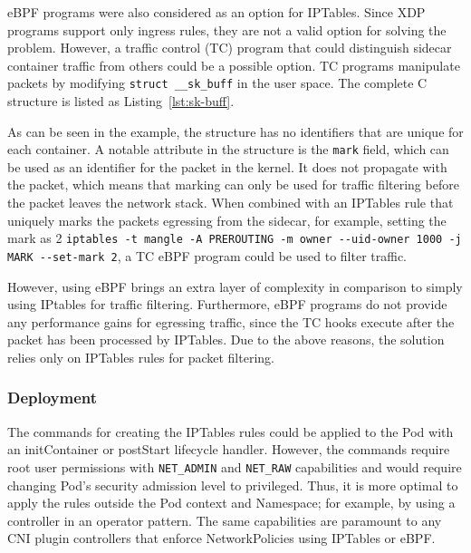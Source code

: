 \documentclass[english, 12pt, a4paper, sci, utf8, a-2b, online]{aaltothesis}
\begin{document}
eBPF programs were also considered as an option for IPTables.
Since XDP programs support only ingress rules, they are not a valid option for solving the problem.
However, a traffic control (TC) program that could distinguish sidecar container traffic from others could be a possible option.
TC programs manipulate packets by modifying \lstinline{struct __sk_buff} in the user space.
The complete C structure is listed as Listing~\ref{lst:sk-buff}.



As can be seen in the example, the structure has no identifiers that are unique for each container.
A notable attribute in the structure is the \lstinline{mark} field, which can be used as an identifier for the packet in the kernel.
It does not propagate with the packet, which means that marking can only be used for traffic filtering before the packet leaves the network stack.
When combined with an IPTables rule that uniquely marks the packets egressing from the sidecar, for example, setting the mark as 2 \lstinline{iptables -t mangle -A PREROUTING -m owner --uid-owner 1000 -j MARK --set-mark 2}, a TC eBPF program could be used to filter traffic.

However, using eBPF brings an extra layer of complexity in comparison to simply using IPtables for traffic filtering.
Furthermore, eBPF programs do not provide any performance gains for egressing traffic, since the TC hooks execute after the packet has been processed by IPTables.
Due to the above reasons, the solution relies only on IPTables rules for packet filtering.

\subsubsection{Deployment} \label{sec:network-solution:deployment}

The commands for creating the IPTables rules could be applied to the Pod with an initContainer or postStart lifecycle handler.
However, the commands require root user permissions with \lstinline{NET_ADMIN} and \lstinline{NET_RAW} capabilities and would require changing Pod's security admission level to privileged.
Thus, it is more optimal to apply the rules outside the Pod context and Namespace; for example, by using a controller in an operator pattern.
The same capabilities are paramount to any CNI plugin controllers that enforce NetworkPolicies using IPTables or eBPF.
\end{document}
